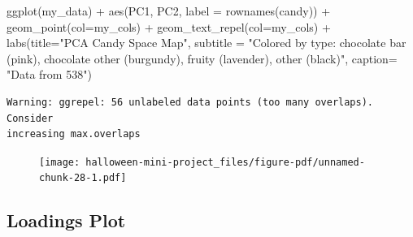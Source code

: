 \documentclass[
  letterpaper,
  DIV=11,
  numbers=noendperiod]{scrartcl}
\newenvironment{Shaded}{\begin{snugshade}}{\end{snugshade}}
\newcommand{\AttributeTok}[1]{\textcolor[rgb]{0.40,0.45,0.13}{#1}}
\newcommand{\DecValTok}[1]{\textcolor[rgb]{0.68,0.00,0.00}{#1}}
\newcommand{\FunctionTok}[1]{\textcolor[rgb]{0.28,0.35,0.67}{#1}}
\newcommand{\NormalTok}[1]{\textcolor[rgb]{0.00,0.23,0.31}{#1}}
\newcommand{\OtherTok}[1]{\textcolor[rgb]{0.00,0.23,0.31}{#1}}
\newcommand{\SpecialCharTok}[1]{\textcolor[rgb]{0.37,0.37,0.37}{#1}}
\newcommand{\StringTok}[1]{\textcolor[rgb]{0.13,0.47,0.30}{#1}}
\begin{document}
\begin{Shaded}
\end{Shaded}

\begin{Shaded}
\begin{Highlighting}[]
\FunctionTok{ggplot}\NormalTok{(my\_data) }\SpecialCharTok{+}
  \FunctionTok{aes}\NormalTok{(PC1, PC2, }\AttributeTok{label =} \FunctionTok{rownames}\NormalTok{(candy)) }\SpecialCharTok{+}
  \FunctionTok{geom\_point}\NormalTok{(}\AttributeTok{col=}\NormalTok{my\_cols) }\SpecialCharTok{+}
  \FunctionTok{geom\_text\_repel}\NormalTok{(}\AttributeTok{col=}\NormalTok{my\_cols) }\SpecialCharTok{+}
  \FunctionTok{labs}\NormalTok{(}\AttributeTok{title=}\StringTok{"PCA Candy Space Map"}\NormalTok{, }\AttributeTok{subtitle =} \StringTok{"Colored by type: chocolate bar (pink), chocolate other (burgundy), fruity (lavender), other (black)"}\NormalTok{, }\AttributeTok{caption=} \StringTok{"Data from 538"}\NormalTok{)}
\end{Highlighting}
\end{Shaded}

\begin{verbatim}
Warning: ggrepel: 56 unlabeled data points (too many overlaps). Consider
increasing max.overlaps
\end{verbatim}

\begin{figure}[H]

{\centering \texttt{[image: halloween-mini-project\_files/figure-pdf/unnamed-chunk-28-1.pdf]}

}

\end{figure}

\hypertarget{loadings-plot}{%
\subsection{Loadings Plot}\label{loadings-plot}}

\begin{Shaded}
\end{Shaded}
\end{document}
